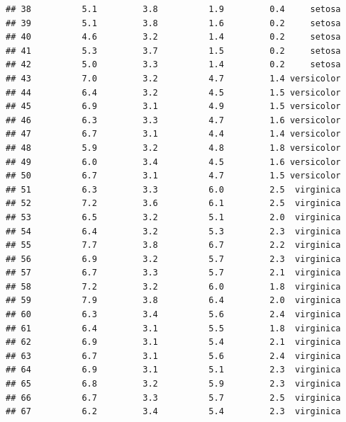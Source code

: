 \documentclass[
]{article}
\begin{document}
\begin{verbatim}
## 38          5.1         3.8          1.9         0.4     setosa
## 39          5.1         3.8          1.6         0.2     setosa
## 40          4.6         3.2          1.4         0.2     setosa
## 41          5.3         3.7          1.5         0.2     setosa
## 42          5.0         3.3          1.4         0.2     setosa
## 43          7.0         3.2          4.7         1.4 versicolor
## 44          6.4         3.2          4.5         1.5 versicolor
## 45          6.9         3.1          4.9         1.5 versicolor
## 46          6.3         3.3          4.7         1.6 versicolor
## 47          6.7         3.1          4.4         1.4 versicolor
## 48          5.9         3.2          4.8         1.8 versicolor
## 49          6.0         3.4          4.5         1.6 versicolor
## 50          6.7         3.1          4.7         1.5 versicolor
## 51          6.3         3.3          6.0         2.5  virginica
## 52          7.2         3.6          6.1         2.5  virginica
## 53          6.5         3.2          5.1         2.0  virginica
## 54          6.4         3.2          5.3         2.3  virginica
## 55          7.7         3.8          6.7         2.2  virginica
## 56          6.9         3.2          5.7         2.3  virginica
## 57          6.7         3.3          5.7         2.1  virginica
## 58          7.2         3.2          6.0         1.8  virginica
## 59          7.9         3.8          6.4         2.0  virginica
## 60          6.3         3.4          5.6         2.4  virginica
## 61          6.4         3.1          5.5         1.8  virginica
## 62          6.9         3.1          5.4         2.1  virginica
## 63          6.7         3.1          5.6         2.4  virginica
## 64          6.9         3.1          5.1         2.3  virginica
## 65          6.8         3.2          5.9         2.3  virginica
## 66          6.7         3.3          5.7         2.5  virginica
## 67          6.2         3.4          5.4         2.3  virginica
\end{verbatim}
\end{document}
